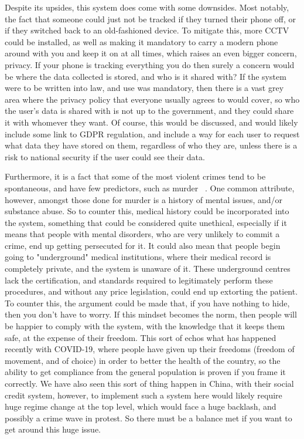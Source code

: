 
Despite its upsides, this system does come with some downsides.
Most notably, the fact that someone could just not be tracked if they turned their phone off, or if they switched
back to an old-fashioned device.
To mitigate this, more CCTV could be installed, as well as making it mandatory to carry a modern phone around with
you and keep it on at all times, which raises an even bigger concern, privacy.
If your phone is tracking everything you do then surely a concern would be where the data collected is stored, and
who is it shared with?
If the system were to be written into law, and use was mandatory, then there is a vast grey area where the
privacy policy that everyone usually agrees to would cover, so who the user's data is shared with is not up to the
government, and they could share it with whomever they want.
Of course, this would be discussed, and would likely include some link to GDPR regulation, and include a way for
each user to request what data they have stored on them, regardless of who they are, unless there is a risk to
national security if the user could see their data.

Furthermore, it is a fact that some of the most violent crimes tend to be spontaneous, and have few predictors, such
as murder ~\cite{dci-walker}.
One common attribute, however, amongst those done for murder is a history of mental issues, and/or substance abuse.
So to counter this, medical history could be incorporated into the system, something that could be considered quite
unethical, especially if it means that people with mental disorders, who are very unlikely to commit a crime, end up
getting persecuted for it.
It could also mean that people begin going to "underground" medical institutions, where their medical record is
completely private, and the system is unaware of it.
These underground centres lack the certification, and standards required to legitimately perform these procedures, and
without any price legislation, could end up extorting the patient.
\\

To counter this, the argument could be made that, if you have nothing to hide, then you don't have to
worry.
If this mindset becomes the norm, then people will be happier to comply with the system, with the knowledge that
it keeps them safe, at the expense of their freedom.
This sort of echos what has happened recently with COVID-19, where people have given up their freedoms (freedom of
movement, and of choice) in order to better the health of the country, so the ability to get compliance from the
general population is proven if you frame it correctly.
We have also seen this sort of thing happen in China, with their social credit system\cite{china-socred}, however, to implement such a
system here would likely require huge regime change at the top level, which would face a huge backlash, and
possibly a crime wave in protest.
So there must be a balance met if you want to get around this huge issue.

